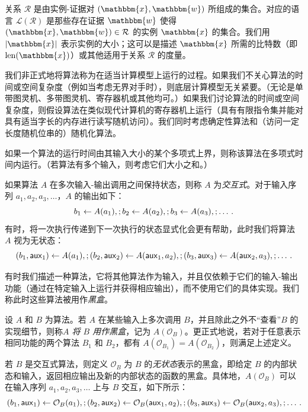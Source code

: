 \documentclass[american,singlepageview]{snargs-book-zh}
\renewcommand{\enspace}{\ensuremath{\thinspace}}
\newcommand{\AuxiliaryState}{\mathsf{aux}}
\newcommand{\BlackBox}[1]{\mathcal{O}_{#1}}
\newcommand{\SomeSize}[1]{|#1|}
\newcommand{\BitSize}[1]{\mathrm{len}(#1)}
\newcommand{\Relation}{\mathcal{R}}
\newcommand{\Language}{\mathcal{L}}
\newcommand{\GetLanguage}[1]{\Language(#1)}
\newcommand{\Instance}{\mathbbm{x}}
\newcommand{\Witness}{\mathbbm{w}}
\begin{document}
关系 $\Relation$ 是由实例-证据对 $(\Instance,\Witness)$ 所组成的集合。对应的语言 $\GetLanguage{\Relation}$ 是那些存在证据 $\Witness$ 使得 $(\Instance,\Witness)\in \Relation$ 的实例 $\Instance$ 的集合。我们用 $\SomeSize{\Instance}$ 表示实例的大小；这可以是描述 $\Instance$ 所需的比特数（即 $\BitSize{\Instance}$）或其他适用于关系 $\Relation$ 的度量。

我们非正式地将算法称为在适当计算模型上运行的过程。如果我们不关心算法的时间或空间复杂度（例如当考虑无界对手时），则底层计算模型无关紧要。（无论是单带图灵机、多带图灵机、寄存器机或其他均可。）如果我们讨论算法的时间或空间复杂度，则假设算法在类似现代计算机的寄存器机上运行（具有有限指令集并能对具有适当字长的内存进行读写随机访问）。我们同时考虑确定性算法和（访问一定长度随机位串的）随机化算法。

如果一个算法的运行时间由其输入大小的某个多项式上界，则称该算法在多项式时间内运行。（若算法有多个输入，则考虑它们大小之和。）

如果算法 $A$ 在多次输入-输出调用之间保持状态，则称 $A$ 为\emph{交互式}。对于输入序列 $a_{1},a_{2},a_{3},\dots$，$A$ 的输出如下：
\begin{equation*}
b_{1} \gets A(a_{1}),;
b_{2} \gets A(a_{2}),;
b_{3} \gets A(a_{3}),;
\dots
\enspace.
\end{equation*}
有时，将一次执行传递到下一次执行的状态显式化会更有帮助，此时我们将算法 $A$ 视为无状态：
\begin{equation*}
(b_{1},\AuxiliaryState_{1}) \gets A(a_{1}),;
(b_{2},\AuxiliaryState_{2}) \gets A(\AuxiliaryState_{1},a_{2}),;
(b_{3},\AuxiliaryState_{3}) \gets A(\AuxiliaryState_{2},a_{3}),;
\dots
\enspace.
\end{equation*}

有时我们描述一种算法，它将其他算法作为输入，并且仅依赖于它们的输入-输出功能（通过在特定输入上运行并获得相应输出），而不使用它们的具体实现。我们称此时这些算法被用作\emph{黑盒}。

设 $A$ 和 $B$ 为算法。若 $A$ 在某些输入上多次调用 $B$，并且除此之外不“查看”$B$ 的实现细节，则称\emph{$A$ 将 $B$ 用作黑盒}，记为 $A(\BlackBox{B})$。更正式地说，若对于任意表示相同功能的两个算法 $B_{1}$ 和 $B_{2}$，都有 $A(\BlackBox{B_{1}})=A(\BlackBox{B_{2}})$，则满足上述定义。

若 $B$ 是交互式算法，则定义 $\BlackBox{B}$ 为 $B$ 的\emph{无状态}表示的黑盒，即给定 $B$ 的内部状态和输入，返回相应输出及新的内部状态的函数的黑盒。具体地，$A(\BlackBox{B})$ 可以在输入序列 $a_{1},a_{2},a_{3},\dots$ 上与 $B$ 交互，如下所示：
\begin{equation*}
(b_{1},\AuxiliaryState_{1}) \gets \BlackBox{B}(a_{1}),;
(b_{2},\AuxiliaryState_{2}) \gets \BlackBox{B}(\AuxiliaryState_{1},a_{2}),;
(b_{3},\AuxiliaryState_{3}) \gets \BlackBox{B}(\AuxiliaryState_{2},a_{3}),;
\dots
\enspace.
\end{equation*}
\end{document}
